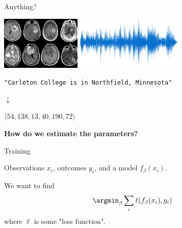 \begin{frame}{Anything?}

	\qquad \includegraphics[height=1in]{brain-scans.jpg}
	\hfill	\pause
	\qquad \includegraphics[height=1in]{audio-signal.png}

	\pause \bigskip

	\begin{center}
		\texttt{"Carleton College is in Northfield, Minnesota"}

		$\downarrow$

		$\langle 54, 138, 13, 40, 190, 72 \rangle$
	\end{center}

	\pause \bigskip


	\begin{center}
		\textbf{How do we estimate the parameters?}
	\end{center}
\end{frame}

\begin{frame}{Training}

	Observations $x_i$, outcomes $y_i$, and a model $f_\beta(x_i)$.

	\pause \bigskip

	We want to find
	\begin{equation*}
		\argmin_\beta \sum_i \ell(f_\beta(x_i), y_i)
	\end{equation*}
	where $\ell$ is some "loss function".

\end{frame}

